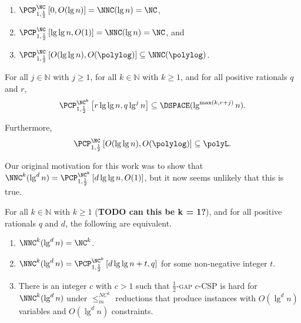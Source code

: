 \documentclass[]{article}
\newcommand{\PCPcs}[5]{\PCP^{#1}_{#2, #3}\left[#4, #5\right]}
\begin{document}
\begin{corollary}\label{cor:pcpinnnc}
  \mbox{}
  \begin{enumerate}
  \item $\PCPcs{\NC}{1}{\frac{1}{2}}{0}{O(\lg n)} = \NNC(\lg n) = \NC$,
  \item $\PCPcs{\NC}{1}{\frac{1}{2}}{\lg \lg n}{O(1)} = \NNC(\lg n) = \NC$, and
  \item $\PCPcs{\NC}{1}{\frac{1}{2}}{O(\lg \lg n)}{O(\polylog)} \subseteq \NNC(\polylog)$.
  \end{enumerate}
\end{corollary}

\begin{corollary}
  For all $j \in \mathbb{N}$ with $j \geq 1$, for all $k \in \mathbb{N}$ with $k \geq 1$, and for all positive rationals $q$ and $r$,
  \begin{equation*}
    \PCPcs{\NC^k}{1}{\frac{1}{2}}{r \lg \lg n}{q \lg^j n} \subseteq \DSPACE(\lg^{\max(k, r + j)} n).
  \end{equation*}

  Furthermore,
  \begin{equation*}
    \PCPcs{\NC}{1}{\frac{1}{2}}{O(\lg \lg n)}{O(\polylog)} \subseteq \polyL.
  \end{equation*}
\end{corollary}



Our original motivation for this work was to show that $\NNC^k(\lg^d n) = \PCPcs{\NC^k}{1}{\frac{1}{2}}{d \lg \lg n}{O(1)}$, but it now seems unlikely that this is true.

\begin{theorem}\label{thm:equiv}
  For all $k \in \mathbb{N}$ with $k \geq 1$ (\textbf{TODO can this be k = 1?}), and for all positive rationals $q$ and $d$, the following are equivalent.
  \begin{enumerate}
  \item $\NNC^k(\lg^d n) = \NC^k$.
  \item $\NNC^k(\lg^d n) = \PCPcs{\NC^k}{1}{\frac{1}{2}}{d \lg \lg n + t}{q}$ for some non-negative integer $t$.
  \item There is an integer $c$ with $c > 1$ such that \textsc{$\frac{1}{2}$-gap $c$-CSP} is hard for $\NNC^k(\lg^d n)$ under $\leq_m^{NC^k}$ reductions that produce instances with $O(\lg^d n)$ variables and $O(\lg^d n)$ constraints.
  \end{enumerate}
\end{theorem}
\end{document}
